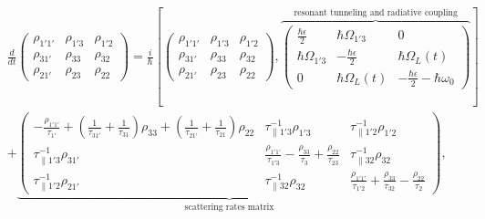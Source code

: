 \documentclass[10pt,letterpaper]{article}
\begin{document}
	\begin{align}
	\label{eq:vonNeumannmatrix}
	& \frac{d}{dt} \begin{pmatrix}
	\rho_{1'1'}& \rho_{1'3} & \rho_{1'2} \\
	\rho_{31'} & \rho_{33} & \rho_{32} \\ 
	\rho_{21'} & \rho_{23} & \rho_{22}
	\end{pmatrix}  =   \frac{i}{\hbar}\left [
	\begin{pmatrix}
	\rho_{1'1'}& \rho_{1'3} & \rho_{1'2} \\
	\rho_{31'} & \rho_{33} & \rho_{32} \\ 
	\rho_{21'} & \rho_{23} & \rho_{22}
	\end{pmatrix} , 
	\overbrace{\begin{pmatrix} 
		\frac{\hbar \epsilon}{2} & \hbar\Omega_{1'3} & 0 \\
		\hbar\Omega_{1'3}  & -\frac{\hbar	\epsilon}{2} &  \hbar\Omega_{L}(t) \\
		0  &\hbar\Omega_{L}(t) & -\frac{\hbar \epsilon}{2}-\hbar\omega_{0}   
		\end{pmatrix} }^{\text{resonant tunneling and radiative coupling}}
	\right ]  \nonumber \\
	& + 
	\underbrace{\begin{pmatrix}
		-\frac{\rho_{1'1'}}{\tau_{1'}} + (\frac{1}{\tau_{31'}}+\frac{1}{\tau_{31}})\rho_{33}  +  (\frac{1}{\tau_{21'}}+\frac{1}{\tau_{21}})\rho_{22} & \tau_{\parallel 1'3}^{-1}\rho_{1'3} & \tau_{\parallel 1'2}^{-1}\rho_{1'2}\\
		\tau_{\parallel 1'3}^{-1}\rho_{31'} & \frac{\rho_{1'1'}}{\tau_{1'3}}   - \frac{\rho_{33}}{\tau_{3}} +  \frac{\rho_{22}}{\tau_{23}} &  \tau_{\parallel 32}^{-1}\rho_{32}\\
		\tau_{\parallel 1'2}^{-1}\rho_{21'}& \tau_{\parallel 32}^{-1}\rho_{32} &	\frac{ \rho_{1'1'}}{\tau_{1'2}} + \frac{\rho_{33} }{\tau_{32}} 	- \frac{\rho_{22}}{\tau_2}
		\end{pmatrix}}_{\text{scattering rates matrix}},
	\end{align}
	
\end{document}
